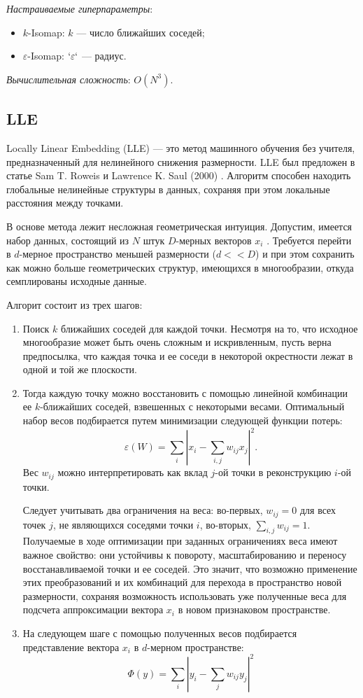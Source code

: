 \documentclass[10pt, a4paper]{extarticle}
\newcommand{\lsum}{\sum\limits}
\begin{document}
\textit{Настраиваемые гиперпараметры}:

\begin{itemize}
	\item $k$-Isomap: $k$ — число ближайших соседей;
	\item $\varepsilon$-Isomap: $`\varepsilon`$ — радиус.
\end{itemize}

\textit{Вычислительная сложность}: $O(N^3)$.



\subsection{LLE}

Locally Linear Embedding (LLE) — это метод машинного обучения без учителя, предназначенный для нелинейного снижения размерности. 
LLE был предложен в статье Sam T. Roweis и Lawrence K. Saul (2000) \cite{roweis2000nonlinear}.
Алгоритм способен находить глобальные нелинейные структуры в данных, сохраняя при этом локальные расстояния между точками.

В основе метода лежит несложная геометрическая интуиция.
Допустим, имеется набор данных, состоящий из $N$ штук $D$-мерных векторов $x_i$ .
Требуется перейти в $d$-мерное пространство меньшей размерности ($d << D$) и при этом сохранить как можно больше геометрических структур, имеющихся в многообразии, откуда семплированы исходные данные.

\newpage

Алгорит состоит из трех шагов:

\begin{enumerate}
	\item
Поиск $k$ ближайших соседей для каждой точки.
Несмотря на то, что исходное многообразие может быть очень сложным и искривленным, пусть верна предпосылка, что каждая точка и ее соседи в некоторой окрестности лежат в одной и той же плоскости.
\item
Тогда каждую точку можно восстановить с помощью линейной комбинации ее $k$-ближайших соседей, взвешенных с некоторыми весами. 
Оптимальный набор весов подбирается путем минимизации следующей функции потерь:
\[
\varepsilon(W) = \lsum_i|x_i - \sum_{i, j}w_{ij}x_j|^2.
\]
Вес $w_{ij}$ можно интерпретировать как вклад $j$-ой точки в реконструкцию $i$-ой точки.

Следует учитывать два ограничения на веса: во-первых, $w_{ij} = 0$ для всех точек $j$, не являющихся соседями точки $i$, во-вторых, $\sum_{i, j}w_{ij} = 1$.
Получаемые в ходе оптимизации при заданных ограничениях веса имеют важное свойство: они устойчивы к повороту, масштабированию и переносу восстанавливаемой точки и ее соседей.
Это значит, что возможно применение этих преобразований и их комбинаций для перехода в пространство новой размерности, сохраняя возможность использовать уже полученные веса для подсчета аппроксимации вектора $x_i$ в новом признаковом пространстве.
\item
На следующем шаге с помощью полученных весов подбирается представление вектора $x_i$ в $d$-мерном пространстве:
\[
\Phi(y) = \lsum_i|y_i - \sum_{j}w_{ij}y_j|^2
\]
\end{enumerate}
\end{document}
